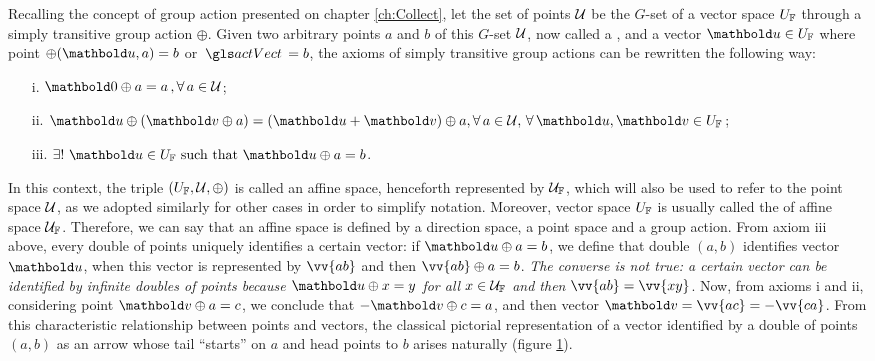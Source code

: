 Recalling the concept of group action presented on chapter \ref{ch:Collect}, let the set of points $\mathcal{U}$ be the $G$-set of a vector space $U_{\mathbb{F}}$ through a simply transitive group action $\oplus$. Given two arbitrary points $a$ and $b$ of this $G$-set $\mathcal{U}$, now called a , and a vector $\vto{u}\in U_\cam{F}$ where point $\fua{\oplus}{\vto{u}, a}=b$ or $\gloref{actVect}=b$, the axioms of simply transitive group actions can be rewritten the following way:
\begin{itemize}\label{ax:pointSpaces}
\setlength\itemsep{.1em}
\item[i.]  $\vto{0}\oplus a=a\,,\forall \, \ele{a} \in \epu{U}$;
\item[ii.] $\vto{u}\oplus(\vto{v}\oplus a)=(\vto{u}+\vto{v})\oplus a, \forall \, \ele{a}\in \epu{U},\,\forall\, \vto{u},\vto{v}\in U_\cam{F}$;
\item[iii.]  $\exists !\,\, \vto{u}\in U_\cam{F}\textrm{ such that } \vto{u}\oplus a=b$.	
\end{itemize}
In this context, the triple $(U_{\mathbb{F}},\mathcal{U},\oplus)$ is called an affine space, henceforth represented by ${\mathcal{U}}_{\mathbb{F}}$, which will also be used to refer to the point space $\mathcal{U}$, as we adopted similarly for other cases in order to simplify notation. Moreover, vector space $U_{\mathbb{F}}$ is usually called the  of affine space ${\mathcal{U}}_{\mathbb{F}}$. Therefore, we can say that an affine space is defined by a direction space, a point space and a group action. From axiom iii above, every double of points uniquely identifies a certain vector: if $\vto{u}\oplus a=b$, we define that double $(a,b)$ identifies vector $\vto{u}$, when this vector is represented by $\vv{ab}$ and then $\vv{ab}\oplus a=b$. \emph{The converse is not true: a certain vector can be identified by infinite doubles of points because $\vto{u}\oplus x=y$ for all $x\in{\mathcal{U}}_{\mathbb{F}}$ and then $\vv{ab}=\vv{xy}$}. Now, from axioms i and ii, considering point $\vto{v}\oplus a=c$, we conclude that $-\vto{v}\oplus c=a$, and then vector $\vto{v}=\vv{ac}=-\vv{ca}$. From this characteristic relationship between points and vectors, the classical pictorial representation of a vector identified by a double of points $(a,b)$ as an arrow whose tail ``starts'' on $a$ and head points to $b$ arises naturally (figure \ref{fg:vetorSeta}).
\begin{figure}[!ht]
\centering
\begin{center}
\scalebox{.72}{}
\end{center}
\label{fg:vetorSeta}
\end{figure}
